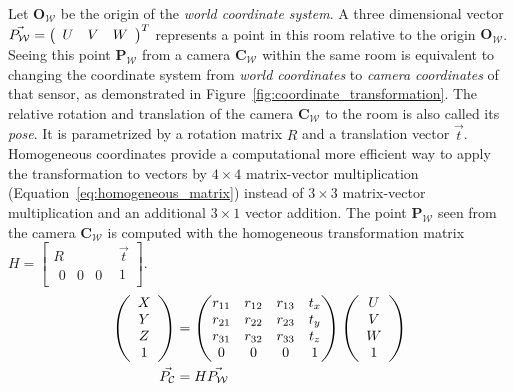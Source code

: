 Let $\mathbf{O_\mathcal{W}}$ be the origin of the \emph{world coordinate system}.
A three dimensional vector $\vec{P_\mathcal{W}} = \left(\begin{array}{ccc} U & V & W \end{array}\right)^T$ represents a point in this room relative to the origin $\mathbf{O_\mathcal{W}}$.
Seeing this point $\mathbf{P_\mathcal{W}}$ from a camera $\mathbf{C_\mathcal{W}}$ within the same room is equivalent to changing the coordinate system from \emph{world coordinates} to \emph{camera coordinates} of that sensor, as demonstrated in Figure~\ref{fig:coordinate_transformation}.
The relative rotation and translation of the camera $\mathbf{C_\mathcal{W}}$ to the room is also called its \emph{pose}\cite[p.15-39]{corke_2011}.
It is parametrized by a rotation matrix $R$ and a translation vector $\vec{t}$.
Homogeneous coordinates provide a computational more efficient way to apply the transformation to vectors by $4 \times 4$ matrix-vector multiplication (Equation~\ref{eq:homogeneous_matrix}) instead of $3 \times 3$ matrix-vector multiplication and an additional $3 \times 1$ vector addition.
The point $\mathbf{P_\mathcal{W}}$ seen from the camera $\mathbf{C_\mathcal{W}}$ is computed with the homogeneous transformation matrix $H = \begin{bmatrix} R & \vec{t} \\ \begin{matrix}0 & 0 & 0\end{matrix} & 1 \end{bmatrix}$.
\begin{equation}
\begin{aligned}
    \left(\begin{array}{c} X \\ Y \\ Z \\ 1\end{array}\right)&= \begin{pmatrix}
        r_{11} & r_{12} & r_{13} & t_x \\
        r_{21} & r_{22} & r_{23} & t_y \\
        r_{31} & r_{32} & r_{33} & t_z \\
        0      & 0      & 0      & 1 \\
    \end{pmatrix} \left(\begin{array}{c} U \\ V \\ W \\ 1\end{array}\right) \\
    \vec{P_\mathcal{C}} &= H \vec{P_\mathcal{W}}
\end{aligned}
\label{eq:homogeneous_matrix}
\end{equation}
